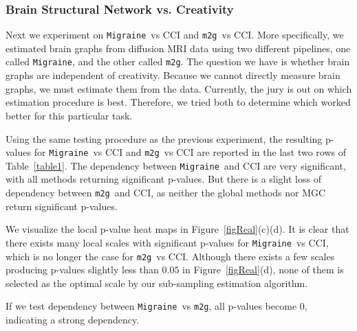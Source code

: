 \documentclass[11pt]{article}
\providecommand{\sct}[1]{{\sc \texttt{#1}}}
\newcommand{\Migraine}{\sct{Migraine}}
\newcommand{\mtg}{\sct{m2g}}
\newcommand{\jv}[1]{{\color{red}{#1}}}
\newcommand{\cs}[1]{{\color{blue}{#1}}}
\begin{document}
\subsubsection{Brain Structural Network vs. Creativity}

Next we experiment on \Migraine~vs CCI and \mtg~vs CCI. More specifically, we estimated brain graphs from diffusion MRI data using two different pipelines, one called \Migraine, and the other called \mtg.  The question we have is whether brain graphs are independent of creativity.  Because we cannot directly measure brain graphs, we must estimate them from the data.  Currently, the jury is out on which estimation procedure is best.  Therefore, we tried both to determine which worked better for this particular task.

Using the same testing procedure as the previous experiment, the resulting p-values for \Migraine~vs CCI and \mtg~vs CCI are reported in the last two rows of Table~\ref{table1}. The dependency between \Migraine~and CCI are very significant, with all methods returning significant p-values. But there is a slight loss of dependency between \mtg~and CCI, as neither the global methods nor MGC return significant p-values. 

We visualize the local p-value heat maps in Figure~\ref{figReal}(c)(d). It is clear that there exists many local scales with significant p-values for \Migraine~vs CCI, which is no longer the case for \mtg~vs CCI. Although there exists a few scales producing p-values slightly less than $0.05$ in Figure~\ref{figReal}(d), none of them is selected as the optimal scale by our sub-sampling estimation algorithm. 

\jv{i don't understand this comment.  optimal scale is the one with the smallest p-value? or estimated higher power? what is the smaller p-value?}
\cs{optimal scale is the one with the highest power. The optimal scale that has the highest power means it is the most reliable scale for testing: more likely to reject ind hypothesis if and only if dependent. For example, a scale that has a smaller p-value may also has a low power, which means the p-value is not so reliable.}
\jv{but how can none be the optimal scale? oh, you mean that for the scales with p less than .05, the power is not as large as other powers? if you mean something like that, please clarify.}
\cs{yes; and under the new estimation method, those scales do not consistently produce significant p-values after sub-sampling.}
If we test dependency between \Migraine~vs \mtg, all p-values become $0$, indicating a strong dependency. 
\end{document}
